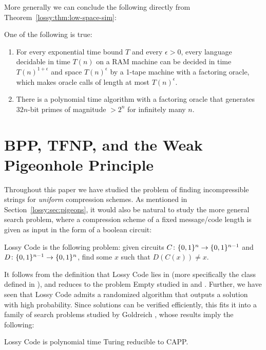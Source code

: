 More generally we can conclude the following directly from Theorem~\ref{lossy:thm:low-space-sim}:
\begin{corollary}\label{lossy:cor:factoring-oracle}
One of the following is true:
\begin{enumerate}
    \item For every exponential time bound $T$ and every $\epsilon>0$, every language decidable in time $T(n)$ on a RAM machine can be decided in time $T(n)^{1+\epsilon}$ and space $T(n)^{\epsilon}$ by a 1-tape machine with a factoring oracle, which makes oracle calls of length at most $T(n)^{\epsilon}$.
    \item There is a polynomial time algorithm with a factoring oracle that generates $32n$-bit primes of magnitude $>2^n$ for infinitely many $n$.
\end{enumerate}
\end{corollary}
\section{BPP, TFNP, and the Weak Pigeonhole Principle}\label{lossy:sec:bpp}
Throughout this paper we have studied the problem of finding incompressible strings for \emph{uniform} compression schemes. As mentioned in Section~\ref{lossy:sec:pigeons}, it would also be natural to study the more general search problem, where a compression scheme of a fixed message/code length is given as input in the form of a boolean circuit:
\begin{definition}
{\sc Lossy Code} is the following problem: given circuits $C\colon \{0,1\}^n \rightarrow \{0,1\}^{n-1}$ and $D\colon \{0,1\}^{n-1} \rightarrow \{0,1\}^n$, find some $x$ such that $D(C(x)) \neq x$.
\end{definition}
It follows from the definition that {\sc Lossy Code} lies in  (more specifically the class  defined in \cite{christos}), and reduces to the problem {\sc Empty} studied in \cite{total} and \cite{Korten}. Further, we have seen that {\sc Lossy Code} admits a randomized algorithm that outputs a solution with high probability. Since solutions can be verified efficiently, this fits it into a family of search problems studied by Goldreich \cite{Goldreich}, whose results imply the following:
\begin{lemma}
{\sc Lossy Code} is polynomial time Turing reducible to {\sc CAPP}.
\end{lemma}

